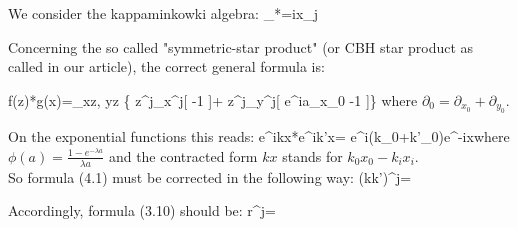 \newcommand{\del}{\partial}
\newcommand{\kM}{$\kappa$-Minkowski}
\newcommand{\kkP}{$\kappa$-Poincar\'{e}}
\newcommand{\p}{\hat{p}}
\newcommand{\q}{\hat{q}}
\newcommand{\hpsi}{\hat{\psi}}
\newcommand{\hphi}{\hat{\phi}}
\newcommand{\ah}{\hat{\alpha}}
\newcommand{\A}{\hat{A}}
\newcommand{\B}{\hat{B}}
\newcommand{\pt}{\tilde{p}}
\newcommand{\ft}{\tilde{f}}
\newcommand{\gt}{\tilde{g}}
\newcommand{\W}{\hat{W}}
\newcommand{\Om}{\hat{Omega}}
\newcommand{\F}{\hat{F}}
\newcommand{\G}{\hat{G}}
\newcommand{\al}{\alpha}
\newcommand{\bt}{\beta}
\newcommand{\s}{\sigma}
\newcommand{\x}{{\bf x}}
\newcommand{\X}{\hat{X}}
\newcommand{\ts}{\left(}
\newcommand{\td}{\right)}
\newcommand{\qs}{\left[}
\newcommand{\gs}{\left{}
\newcommand{\gd}{\right}}
\newcommand{\qd}{\right]}
\newcommand{\vq}{\vec{q}}
\newcommand{\vs}{\vec{s}}
\newcommand{\vt}{\vec{t}}
\newcommand{\vk}{\vec{k}}
\newcommand{\vl}{\vec{l}}
\newcommand{\vx}{\vec{x}}
\newcommand{\vp}{\vec{p}}
\newcommand{\adr}{\stackrel{ad}{\triangleright}}
\newcommand{\D}{{\mathcal{D}}}
\newcommand{\mN}{\mathcal{N}}
\newcommand{\mM}{\mathcal{M}}
\newcommand{\trir}{\triangleright}
\newcommand{\mP}{{\mathcal{P}}}
\newcommand{\de}{d}









We consider the kappaminkowki algebra:
\be
[x_0,x_j]_*=i\lambda x_j
\ee

Concerning the so
called  "symmetric-star product" (or CBH star product as called in
our article), the correct general formula is:


\be f(z)*g(x)=\lim_{x\to z, y\to z} \exp\big\{  z^j\partial_{x^j}[
 -1 ]+
z^j\partial_{y^j}[ 
e^{ia\partial_{x_0}}
-1 ]\big\} \ee where $\partial_0=\partial_{x_0}+\partial_{y_0}$.


 On the exponential functions this reads:
  \be e^{ikx}*e^{ik'x}=
e^{i(k_0+k'_0)}e^{-ix}\ee where
$\phi(a)=\frac{1-e^{-\lambda a }}{\lambda a }$ and the contracted
form $kx$ stands for $k_0x_0-k_ix_i$. \\
So formula (4.1) must be corrected in the following way: \be
(k\oplus k')^j= \ee


Accordingly, formula (3.10) should be: \be
r^j=\ee






